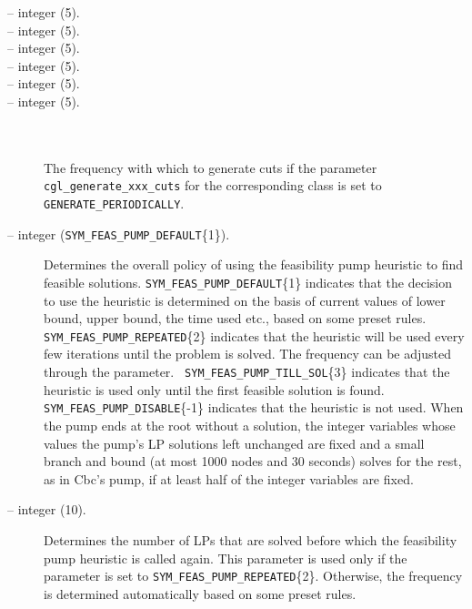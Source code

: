 \begin{description}
\item[ -- integer (5).] 
\item[ -- integer (5).] 
\item[ -- integer (5).] 
\item[ -- integer (5).] 
\item[ -- integer (5).] 
\item[ -- integer (5).] 
\ \\ \ \\
The frequency with which to generate cuts if the
parameter \texttt{cgl\_generate\_xxx\_cuts} for the
corresponding class is set to \texttt{GENERATE\_PERIODICALLY}.

\label{fp_enabled}
\item[ -- integer ({\tt SYM\_FEAS\_PUMP\_DEFAULT}\{1\}).] 
Determines the overall policy of using the feasibility pump heuristic to find
feasible solutions. {\tt SYM\_FEAS\_PUMP\_DEFAULT}\{1\} indicates that the
decision to use the heuristic is determined on the basis of current values of
lower bound, upper bound, the time used etc., based on some preset rules. {\tt
SYM\_FEAS\_PUMP\_REPEATED}\{2\} indicates that the heuristic will be used
every few iterations until the problem is solved. The frequency can be
adjusted through the  parameter.  {\tt
SYM\_FEAS\_PUMP\_TILL\_SOL}\{3\} indicates that the heuristic is used only
until the first feasible solution is found. {\tt
SYM\_FEAS\_PUMP\_DISABLE}\{-1\} indicates that the heuristic is not used.
When the pump ends at the root without a solution, the integer variables
whose values the pump's LP solutions left unchanged are fixed and a small
branch and bound (at most 1000 nodes and 30 seconds) solves for the rest, as
in Cbc's pump, if at least half of the integer variables are fixed.

\item[ -- integer (10).] 
Determines the number of LPs that are solved before which the feasibility pump
heuristic is called again. This parameter is used only if the parameter
 is set to {\tt SYM\_FEAS\_PUMP\_REPEATED}\{2\}. Otherwise,
the frequency is determined automatically based on some preset rules. 


\end{description}
